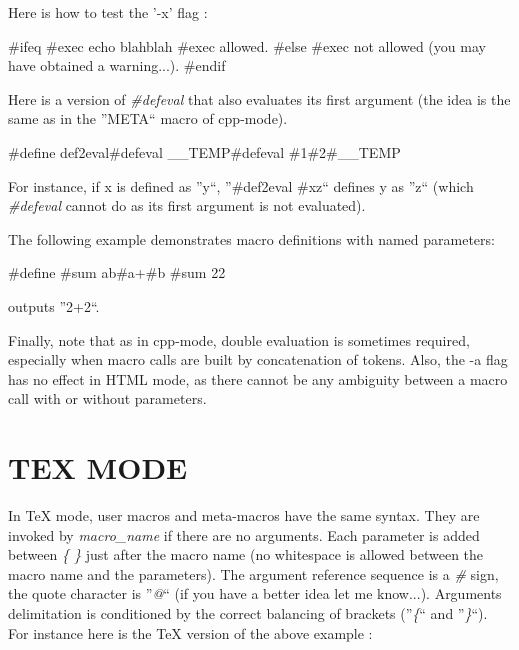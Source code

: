 Here is how to test the '-x' flag : 

\begin{PRE}
   {\htmlLt}\#ifeq {\htmlLt}\#exec echo blah{\htmlGt}{\htmlBar}blah
   {\htmlGt}
   \#exec allowed.
   {\htmlLt}\#else{\htmlGt}
   \#exec not allowed (you may have obtained a warning...).
   {\htmlLt}\#endif{\htmlGt}
\end{PRE}

Here is a version of {\it \#defeval} that also evaluates its first argument
(the idea is the same as in the ''META`` macro of cpp-mode). 

\begin{PRE}
   {\htmlLt}\#define def2eval{\htmlBar}{\htmlLt}\#defeval \_\_TEMP{\htmlBar}{\htmlLt}{\htmlBackslash}\#defeval \#1{\htmlBar}\#2{\htmlGt}{\htmlGt}{\htmlLt}\#\_\_TEMP{\htmlGt}{\htmlGt}
\end{PRE}

For instance, if x is defined as ''y``, ''{\htmlLt}\#def2eval
{\htmlLt}\#x{\htmlGt}{\htmlBar}z{\htmlGt}`` defines y as ''z`` (which {\it
\#defeval} cannot do as its first argument is not evaluated). 

The following example demonstrates macro definitions with named parameters: 

\begin{PRE}
   {\htmlLt}\#define {\htmlLt}\#sum a{\htmlBar}b{\htmlGt}{\htmlBar}{\htmlLt}\#a{\htmlGt}+{\htmlLt}\#b{\htmlGt}{\htmlGt}
   {\htmlLt}\#sum 2{\htmlBar}2{\htmlGt}
\end{PRE}

outputs ''2+2``. 

Finally, note that as in cpp-mode, double evaluation is sometimes required,
especially when macro calls are built by concatenation of tokens. Also, the -a
flag has no effect in HTML mode, as there cannot be any ambiguity between a
macro call with or without parameters. 

\htmlHR

\section{TEX MODE}

In TeX mode, user macros and meta-macros have the same syntax. They are
invoked by {\htmlBackslash}{\it macro\_name} if there are no arguments. Each
parameter is added between {\it \{ \}} just after the macro name (no
whitespace is allowed between the macro name and the parameters). The argument
reference sequence is a {\it \#} sign, the quote character is ''{\it @}`` (if
you have a better idea let me know...). Arguments delimitation is conditioned
by the correct balancing of brackets (''{\it \{}`` and ''{\it \}}``). For
instance here is the TeX version of the above example : 

